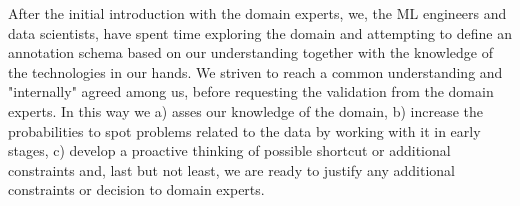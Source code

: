 




After the initial introduction with the domain experts, we, the ML engineers and data scientists, have spent time exploring the domain and attempting to define an annotation schema based on our understanding together with the knowledge of the technologies in our hands. We striven to reach a common understanding and "internally" agreed among us, before requesting the validation from the domain experts. 
In this way we a) asses our knowledge of the domain, b) increase the probabilities to spot problems related to the data by working with it in early stages, c) develop a proactive thinking of possible shortcut or additional constraints and, last but not least, we are ready to justify any additional constraints or decision to domain experts. 

